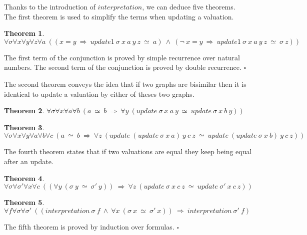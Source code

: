 \documentclass[submission,copyright,creativecommons]{eptcs}
\def\imp{\mathbin{\Rightarrow}}
\def\fa{{\forall}}
\DeclareMathOperator{\blneg}{{\neg}}
\def\conj{\mathbin{\wedge}}
\newtheorem{theorem}{Theorem}[section]
\newenvironment{proof}{\noindent {\em Proof.}}{\medskip}
\begin{document}
Thanks to the introduction of $interpretation$, we can deduce five theorems. \\

The first theorem is used to simplify the terms when updating a valuation.

\begin{theorem}
$\fa \sigma \fa x \fa y \fa z \fa a ~((x = y \ \imp \ update1 \ \sigma \ x \ a \ y \ z \ \simeq \ a) \ \conj \ (\blneg \ x = y \ \imp \ update1 \ \sigma \ x \ a \ y \ z \ \simeq \ \sigma \ z))$
\end{theorem}

\begin{proof}
The first term of the conjunction is proved by simple recurrence over natural numbers. The second term of the conjunction is proved by double recurrence. $\square$
\end{proof}

The second theorem conveys the idea that if two graphs are bisimilar then it is identical to update a valuation by either of theses two graphs.

\begin{theorem}
$\fa \sigma \fa x \fa a \fa b ~(a \ \simeq \ b \ \imp \ \fa y ~(update \ \sigma \ x \ a \ y \ \simeq \ update \ \sigma \ x \ b \ y))$
\end{theorem}

\begin{theorem}
$\fa \sigma \fa x \fa y \fa a \fa b \fa c ~(a \ \simeq \ b \ \imp \ \fa z~ (update \ (update \ \sigma \ x \ a) \ y \ c \ z \ \simeq \ update \  (update \ \sigma \ x \ b) \ y \ c \ z))$
\end{theorem}

The fourth theorem states that if two valuations are equal they keep being equal after an update.

\begin{theorem}
$\fa \sigma \fa \sigma' \fa x \fa c~ ((\fa y~ (\sigma \ y \ \simeq \ \sigma' \ y)) \ \imp \ \fa z~ (update \ \sigma \ x \ c \ z \ \simeq \ update \ \sigma' \ x \ c \ z))$
\end{theorem}

\begin{theorem}
$\fa f \fa \sigma \fa \sigma' ~((interpretation \ \sigma \ f \ \conj \ \fa x ~(\sigma \ x \ \simeq \ \sigma' \ x)) \ \imp \ interpretation \ \sigma' \ f)$
\end{theorem}

\begin{proof}
The fifth theorem is proved by induction over formulas. $\square$
\end{proof}
\end{document}

